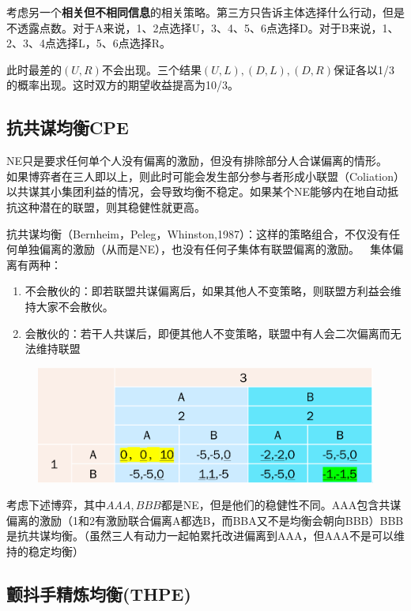 \documentclass[UTF8,12pt]{ctexart}
\numberwithin{equation}{section} %
\numberwithin{figure}{section}
\numberwithin{table}{section}
\begin{document}
	考虑另一个\textbf{相关但不相同信息}的相关策略。第三方只告诉主体选择什么行动，但是不透露点数。对于A来说，1、2点选择U，3、4、5、6点选择D。对于B来说，1、2、3、4点选择L，5、6点选择R。
	
	此时最差的$(U,R)$不会出现。三个结果$(U,L),(D,L),(D,R)$保证各以1/3的概率出现。这时双方的期望收益提高为10/3。
	
	\subsection{抗共谋均衡CPE}
	
	NE只是要求任何单个人没有偏离的激励，但没有排除部分人合谋偏离的情形。
	 如果博弈者在三人即以上，则此时可能会发生部分参与者形成小联盟（Coliation）以共谋其小集团利益的情况，会导致均衡不稳定。如果某个NE能够内在地自动抵抗这种潜在的联盟，则其稳健性就更高。
	
	抗共谋均衡（Bernheim，Peleg，Whinston,1987）：这样的策略组合，不仅没有任何单独偏离的激励（从而是NE），也没有任何子集体有联盟偏离的激励。
	
	集体偏离有两种：
	\begin{enumerate}
		\item 不会散伙的：即若联盟共谋偏离后，如果其他人不变策略，则联盟方利益会维持大家不会散伙。
		
		\item 会散伙的：若干人共谋后，即便其他人不变策略，联盟中有人会二次偏离而无法维持联盟
	\end{enumerate}
	
	\begin{figure}[htbp]
		\centering
		\includegraphics[scale=0.5]{"1.png"}
	\end{figure}
	
	考虑下述博弈，其中$AAA,BBB$都是NE，但是他们的稳健性不同。AAA包含共谋偏离的激励（1和2有激励联合偏离A都选B，而BBA又不是均衡会朝向BBB）BBB是抗共谋均衡。（虽然三人有动力一起帕累托改进偏离到AAA，但AAA不是可以维持的稳定均衡）
	
	\subsection{颤抖手精炼均衡(THPE)}
	
\end{document}
